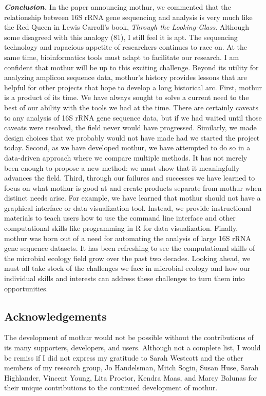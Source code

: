\documentclass[11pt,]{article}
\begin{document}
\textbf{\emph{Conclusion.}} In the paper announcing mothur, we commented
that the relationship between 16S rRNA gene sequencing and analysis is
very much like the Red Queen in Lewis Carroll's book, \emph{Through the
Looking-Glass}. Although some disagreed with this analogy (81), I still
feel it is apt. The sequencing technology and rapacious appetite of
researchers continues to race on. At the same time, bioinformatics tools
must adapt to facilitate our research. I am confident that mothur will
be up to this exciting challenge. Beyond its utility for analyzing
amplicon sequence data, mothur's history provides lessons that are
helpful for other projects that hope to develop a long historical arc.
First, mothur is a product of its time. We have always sought to solve a
current need to the best of our ability with the tools we had at the
time. There are certainly caveats to any analysis of 16S rRNA gene
sequence data, but if we had waited until those caveats were resolved,
the field never would have progressed. Similarly, we made design choices
that we probably would not have made had we started the project today.
Second, as we have developed mothur, we have attempted to do so in a
data-driven approach where we compare multiple methods. It has not
merely been enough to propose a new method: we must show that it
meaningfully advances the field. Third, through our failures and
successes we have learned to focus on what mothur is good at and create
products separate from mothur when distinct needs arise. For example, we
have learned that mothur should not have a graphical interface or data
visualization tool. Instead, we provide instructional materials to teach
users how to use the command line interface and other computational
skills like programming in R for data visualization. Finally, mothur was
born out of a need for automating the analysis of large 16S rRNA gene
sequence datasets. It has been refreshing to see the computational
skills of the microbial ecology field grow over the past two decades.
Looking ahead, we must all take stock of the challenges we face in
microbial ecology and how our individual skills and interests can
address these challenges to turn them into opportunities.

\hypertarget{acknowledgements}{%
\subsection{Acknowledgements}\label{acknowledgements}}

The development of mothur would not be possible without the
contributions of its many supporters, developers, and users. Although
not a complete list, I would be remiss if I did not express my gratitude
to Sarah Westcott and the other members of my research group, Jo
Handelsman, Mitch Sogin, Susan Huse, Sarah Highlander, Vincent Young,
Lita Proctor, Kendra Maas, and Marcy Balunas for their unique
contributions to the continued development of mothur.
\end{document}
